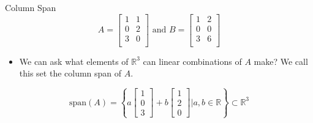 \documentclass[aspectratio=43]{beamer}
\begin{document}
\begin{frame}{Column Span}
  $$
    A = \begin{bmatrix}
      1 & 1 \\
      0 & 2 \\
      3 & 0 \\
    \end{bmatrix} \text{ and }
    B = \begin{bmatrix}
      1 & 2 \\
      0 & 0 \\
      3 & 6 \\
    \end{bmatrix}
  $$
  \begin{itemize}
    \item We can ask what elements of $\mathbb{R}^3$ can linear combinations of $A$ make? We call this set the \alert{column span} of $A$.
  \end{itemize}

  $$ \text{span}(A) = \left\{ a \begin{bmatrix}1 \\ 0 \\ 3 \end{bmatrix} + b \begin{bmatrix}1 \\ 2 \\ 0\end{bmatrix} | a,b \in \mathbb{R} \right\} \subset \mathbb{R}^3$$

\end{frame}
\end{document}
